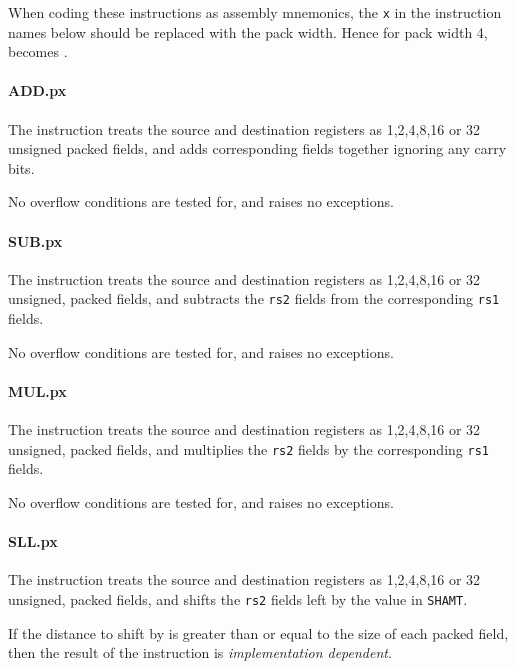 When coding these instructions as assembly mnemonics, the {\tt x} in the
instruction names below should be replaced with the pack width. Hence
for pack width 4,  becomes .

\paragraph{ADD.px}

The instruction  treats the source and destination registers as
1,2,4,8,16 or 32 unsigned packed fields, and adds corresponding fields
together ignoring any carry bits.

No overflow conditions are tested for, and  raises no exceptions.

\paragraph{SUB.px}

The instruction  treats the source and destination registers as
1,2,4,8,16 or 32 unsigned, packed fields, and subtracts the {\tt rs2} fields
from the corresponding {\tt rs1} fields.

No overflow conditions are tested for, and  raises no exceptions.

\paragraph{MUL.px}

The instruction  treats the source and destination registers as
1,2,4,8,16 or 32 unsigned, packed fields, and multiplies the {\tt rs2} fields
by the corresponding {\tt rs1} fields.

No overflow conditions are tested for, and  raises no exceptions.

\paragraph{SLL.px}

The instruction  treats the source and destination registers as
1,2,4,8,16 or 32 unsigned, packed fields, and shifts the {\tt rs2} fields
left by the value in {\tt SHAMT}.

If the distance to shift by is greater than or equal to the size of each
packed field, then the result of the  instruction is
{\em implementation dependent}.

